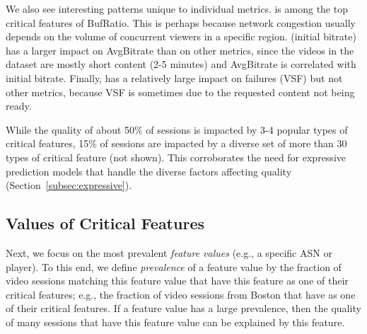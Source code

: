 We also see  interesting patterns unique to individual metrics.
\fCity is among the top critical features of BufRatio. This is perhaps because network
congestion usually depends on the volume of concurrent viewers in a specific
region.  \fBitrate (initial bitrate) has a larger impact on AvgBitrate than
on other metrics, since the videos in the dataset are mostly short content
(2-5 minutes) and AvgBitrate is correlated with initial bitrate. 
 Finally, \fContentName has a relatively large impact on failures (VSF) but not 
 other metrics, because VSF is sometimes due to the requested content not being ready. 


While the quality of about 50\% of sessions is impacted by
3-4 popular types of critical features, 15\% of sessions are
 impacted by a diverse set of more than 30 types of critical feature (not shown).  
This corroborates the need for expressive prediction models that handle the diverse
factors affecting quality (Section~\ref{subsec:expressive}). %


\subsection{Values of Critical Features}
\label{subsec:insight-value}


Next, we focus on the most prevalent {\em feature values} 
(e.g., a specific ASN or player).  
To this end, we define {\em prevalence} of a feature value  
by the fraction of video sessions matching this feature value 
that have this feature as one of their critical features; e.g., 
the fraction of video sessions from Boston that have \fCity
as one of their critical features.
If a feature value has a large prevalence, then the  quality 
of many  sessions that have this feature value can be 
explained by this feature.


